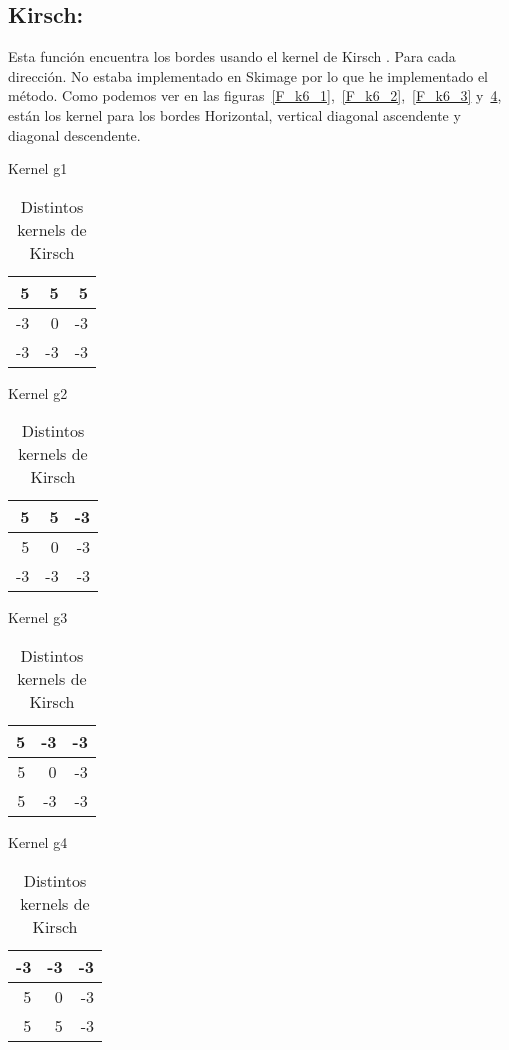\subsection{Kirsch:}
Esta función encuentra los bordes usando el kernel de Kirsch \cite{wiki:Kirsch}. Para cada dirección.
No estaba implementado en Skimage por lo que he implementado el método.
Como podemos ver en las figuras~\ref{F_k6_1},~\ref{F_k6_2},~\ref{F_k6_3} y~\ref{F_k6_4}, están los kernel para los bordes Horizontal, vertical diagonal ascendente y diagonal descendente.
\begin{table}[!htb]

	\begin{minipage}{.5\linewidth}
		\centering
		\caption{Kernel g1}
		\label{F_k6_1}
		\begin{tabular}{|r|r|r|}
			\hline
			5  & 5  & 5  \\ \hline
			-3 & 0  & -3 \\ \hline
			-3 & -3 & -3 \\ \hline
		\end{tabular}
    \end{minipage}%
	\begin{minipage}{.5\linewidth}
		\centering
		\caption{Kernel g2}
		\label{F_k6_2}
		\begin{tabular}{|r|r|r|}
			\hline
			5  & 5  & -3  \\ \hline
			5 & 0  & -3 \\ \hline
			-3 & -3 & -3 \\ \hline
		\end{tabular}
    \end{minipage}%


	\begin{minipage}{.5\linewidth}
		\centering
		\caption{Kernel g3}
		\label{F_k6_3}
		\begin{tabular}{|r|r|r|}
			\hline
			5  & -3 & -3  \\ \hline
			5 & 0  & -3 \\ \hline
			5 & -3 & -3 \\ \hline
		\end{tabular}
    \end{minipage}%
	\begin{minipage}{.5\linewidth}
		\centering
		\caption{Kernel g4}
		\label{F_k6_4}
		\begin{tabular}{|r|r|r|}
			\hline
			-3  & -3 & -3  \\ \hline
			5 & 0  & -3 \\ \hline
			5 & 5 & -3 \\ \hline
		\end{tabular}
    \end{minipage}%
    \caption{Distintos kernels de Kirsch}
\end{table}

